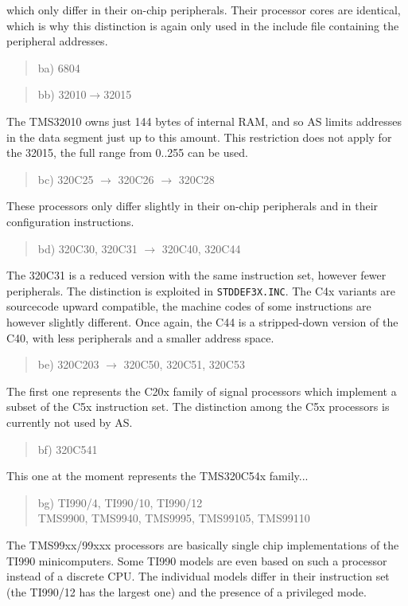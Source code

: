 \documentclass[12pt,twoside]{report}
\newcommand{\tty}[1]{{\tt #1}}
\begin{document}
which only differ in their on-chip peripherals.  Their processor
cores are identical, which is why this distinction is again only used
in the include file containing the peripheral addresses.
\begin{quote}
ba) 6804
\end{quote}
\begin{quote}
bb) 32010$\rightarrow$32015
\end{quote}
The TMS32010 owns just 144 bytes of internal RAM, and so AS limits
addresses in the data segment just up to this amount.  This restriction
does not apply for the 32015, the full range from 0..255 can be used.
\begin{quote}
bc) 320C25 $\rightarrow$ 320C26 $\rightarrow$ 320C28
\end{quote}
These processors only differ slightly in their on-chip peripherals
and in their configuration instructions.
\begin{quote}
bd) 320C30, 320C31 $\rightarrow$ 320C40, 320C44
\end{quote}
The 320C31 is a reduced version with the same instruction set,
however fewer peripherals.  The distinction is exploited in
\tty{STDDEF3X.INC}.  The C4x variants are sourcecode upward
compatible, the machine codes of some instructions are however
slightly different.  Once again, the C44 is a stripped-down
version of the C40, with less peripherals and a smaller address
space.
\begin{quote}
be) 320C203 $\rightarrow$ 320C50, 320C51, 320C53
\end{quote}
The first one represents the C20x family of signal processors which
implement a subset of the C5x instruction set.  The distinction among the
C5x processors is currently not used by AS.
\begin{quote}
bf) 320C541
\end{quote}
This one at the moment represents the TMS320C54x family...
\begin{quote}
bg) TI990/4, TI990/10, TI990/12 \\
    TMS9900, TMS9940, TMS9995, TMS99105, TMS99110
\end{quote}
The TMS99xx/99xxx processors are basically single chip implementations
of the TI990 minicomputers.  Some TI990 models are even based on such
a processor instead of a discrete CPU.  The individual models differ in their
instruction set (the TI990/12 has the largest one) and the presence of a
privileged mode.
\end{document}
